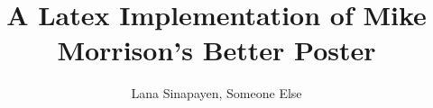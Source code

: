 \documentclass[a3paper]{article}
\title{A Latex Implementation of Mike Morrison's Better Poster}
\author{Lana Sinapayen, Someone Else}
\begin{document}


\begin{figure}[H]
    \vspace{2cm}
    
\end{figure}





\end{document}
